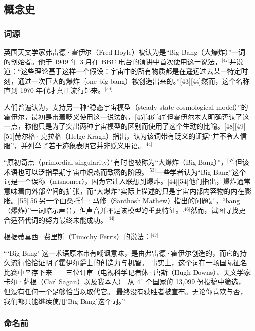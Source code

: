 \subsection{概念史}
\subsubsection{词源}
英国天文学家弗雷德·霍伊尔（Fred Hoyle）被认为是“Big Bang（大爆炸）”一词的创始者。他于 1949 年 3 月在 BBC 电台的演讲中首次使用这一说法，\(^\text{[42]}\)并说道：“这些理论基于这样一个假设：宇宙中的所有物质都是在遥远过去某一特定时刻，通过一次巨大的爆炸（one big bang）被创造出来的。”[43][44]然而，这个名称直到 1970 年代才真正流行起来。\(^\text{[44]}\)

人们普遍认为，支持另一种“稳态宇宙模型（steady-state cosmological model）”的霍伊尔，最初是带着贬义使用这一说法的，[45][46][47]但霍伊尔本人明确否认了这一点，称他只是为了突出两种宇宙模型的区别而使用了这个生动的比喻。[48][49][51]赫尔格·克拉格（Helge Kragh）指出，认为该词带有贬义的证据“并不令人信服”，并列举了若干迹象表明它并非贬义用语。\(^\text{[44]}\)

“原初奇点（primordial singularity）”有时也被称为“大爆炸（Big Bang）”，\(^\text{[52]}\)但该术语也可以泛指早期宇宙中炽热而致密的阶段。\(^\text{[53]}\)一些学者认为“Big Bang”这个词是一个误称（misnomer），因为它让人联想到爆炸。[44][54]他们指出，爆炸通常意味着向外部空间的扩张，而“大爆炸”实际上描述的只是宇宙内部内容物的内在膨胀。[55][56]另一个由桑托什·马修（Santhosh Mathew）指出的问题是，“bang（爆炸）”一词暗示声音，但声音并不是该模型的重要特征。\(^\text{[46]}\)然而，试图寻找更合适替代词的努力最终未能成功。\(^\text{[44]}\)

根据蒂莫西·费里斯（Timothy Ferris）的说法：\(^\text{[47]}\)  

“‘Big Bang’ 这一术语原本带有嘲讽意味，是由弗雷德·霍伊尔创造的，而它的持久流行恰恰证明了霍伊尔爵士的创造力与机智。  
事实上，这个词在一场国际征名比赛中幸存下来——三位评审（电视科学记者休·唐斯（Hugh Downs）、天文学家卡尔·萨根（Carl Sagan）以及我本人）  
从 41 个国家的 13,099 份投稿中筛选，但没有任何一个足够恰当以取代它。  
最终没有获胜者被宣布。无论你喜欢与否，我们都只能继续使用‘Big Bang’这个词。”
\subsubsection{命名前}



